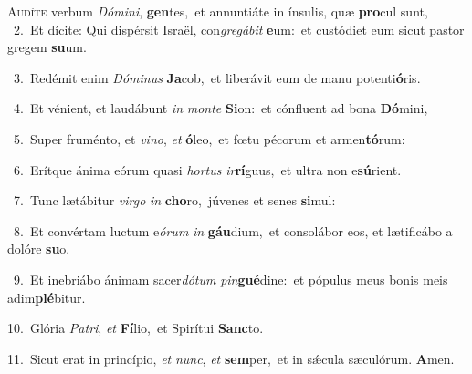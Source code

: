 \lettrine{\initial\textcolor{\initialcolor}{A}}{udíte} verbum \textit{Dó}\-\textit{mi}\textit{ni}, \textbf{gen}\-tes,~\star et annuntiáte in ínsulis, quæ \textbf{pro}\-cul sunt,\\
{\numbfont\textcolor{\numbcolor}{~2.}}~Et dícite: Qui dispérsit Israël, con\-\textit{gre}\-\textit{gá}\textit{bit} \textbf{e}\-um:~\star et custódiet eum sicut pastor gregem \textbf{su}\-um.\par
{\numbfont\textcolor{\numbcolor}{~3.}}~Redémit enim \textit{Dó}\-\textit{mi}\textit{nus} \textbf{Ja}\-cob,~\star et liberávit eum de manu potenti\-\textbf{ó}\-ris.\par
{\numbfont\textcolor{\numbcolor}{~4.}}~Et vénient, et laudábunt \textit{in} \textit{mon}\-\textit{te} \textbf{Si}\-on:~\star et cónfluent ad bona \textbf{Dó}\-mini,\par
{\numbfont\textcolor{\numbcolor}{~5.}}~Super fruménto, et \textit{vi}\-\textit{no}, \textit{et} \textbf{ó}\-leo,~\star et fœtu pécorum et armen\-\textbf{tó}\-rum:\par
{\numbfont\textcolor{\numbcolor}{~6.}}~Erítque ánima eórum quasi \textit{hor}\-\textit{tus} \textit{ir}\-\textbf{rí}guus,~\star et ultra non e\-\textbf{sú}\-rient.\par
{\numbfont\textcolor{\numbcolor}{~7.}}~Tunc lætábitur \textit{vir}\-\textit{go} \textit{in} \textbf{cho}\-ro,~\star júvenes et senes \textbf{si}\-mul:\par
{\numbfont\textcolor{\numbcolor}{~8.}}~Et convértam luctum e\-\textit{ó}\-\textit{rum} \textit{in} \textbf{gáu}\-dium,~\star et consolábor eos, et lætificábo a dolóre \textbf{su}\-o.\par
{\numbfont\textcolor{\numbcolor}{~9.}}~Et inebriábo ánimam sacer\-\textit{dó}\-\textit{tum} \textit{pin}\-\textbf{gué}dine:~\star et pópulus meus bonis meis adim\-\textbf{plé}\-bitur.\par
{\numbfont\textcolor{\numbcolor}{10.}}~Glória \textit{Pa}\-\textit{tri}, \textit{et} \textbf{Fí}\-lio,~\star et Spirítui \textbf{Sanc}\-to.\par
{\numbfont\textcolor{\numbcolor}{11.}}~Sicut erat in princípio, \textit{et} \textit{nunc}\-, \textit{et} \textbf{sem}\-per,~\star et in sǽcula sæculórum. \textbf{A}\-men.\par
